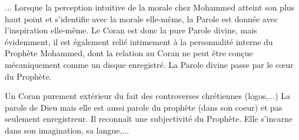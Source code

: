 ... Lorsque la perception intuitive de la morale chez Mohammed atteint
son plus haut point et s'identifie avec la morale elle-même, la Parole
est donnée avec l'inspiration elle-même. Le Coran est donc la pure
Parole divine, mais évidemment, il est également relié intimement à la
personnalité interne du Prophète Mohammed, dont la relation au Coran ne
peut être conçue mécaniquement comme un disque enregistré. La Parole
divine passe par le cœur du Prophète.



\begin{Synthesis}
Un Coran purement extérieur du fait des controverses chrétiennes (logos,...)
La parole de Dieu mais elle est aussi parole du prophète (dans son coeur) et pas seulement enregistreur. Il reconnaît une subjectivité du Prophète. Elle s'incarne dans son imagination, sa langue,...
\end{Synthesis}